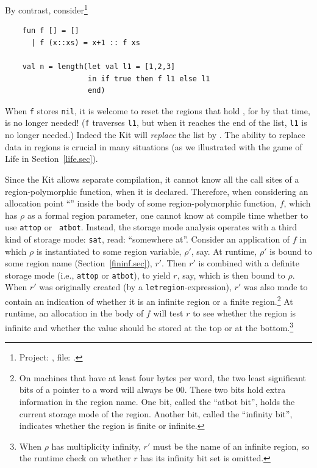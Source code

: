 \documentclass[12pt]{book}
\begin{document}
By contrast, consider\footnote{Project: , file: .}
\begin{verbatim}
    fun f [] = []
      | f (x::xs) = x+1 :: f xs

    val n = length(let val l1 = [1,2,3]
                   in if true then f l1 else l1
                   end)
\end{verbatim}
When {\tt f} stores {\tt nil}, it is welcome to reset the regions that
hold , for by that time,  is
no longer needed! ({\tt f} traverses {\tt l1}, but when it reaches the
end of the list, {\tt l1} is no longer needed.)  Indeed the Kit will
{\em replace} the list \boxml{[1,2,3]} by \boxml{[2,3,4]}. The ability
to replace data in regions is crucial in many situations (as we
illustrated with the game of Life in Section~\ref{life.sec}).

Since the Kit allows  separate compilation, it
cannot know all the call sites of a region-polymorphic function,
when it is declared.
Therefore, when considering an allocation point ``''
inside the body of some region-polymorphic function, $f$, which
has $\rho$ as a formal region parameter,
one cannot know at compile time whether to use {\tt attop} or {\tt
atbot}.  Instead, the storage mode analysis operates with a third kind of
storage mode: {\tt sat}, read: ``somewhere at''. Consider an
application of $f$ in which $\rho$ is
instantiated to some region variable, $\rho'$, say. At runtime, $\rho'$
is bound to some region name (Section~\ref{fininf.sec}), $r'$.
Then $r'$ is combined with a definite storage mode 
(i.e., {\tt attop} or {\tt atbot}), to yield $r$, say, which
is then bound to $\rho$.
When $r'$ was originally created (by a {\tt letregion}-expression),
$r'$ was also made to contain an indication
of whether it is an infinite region or a finite 
region.\footnote{On machines\label{atbit.lab} that have at least four bytes per
word, the two least significant bits of a pointer to a word
will always be 00. These two bits hold extra information in
the region name.
One bit, called the ``atbot bit'', holds the current storage mode of
the region. Another bit, called the ``infinity bit'', indicates whether
the region is finite or infinite.} 
At runtime, an allocation  in the body
of $f$ will test $r$ to see whether the region is infinite and 
whether the value should be stored at the top or at the bottom.\footnote{When
$\rho$ has multiplicity infinity, $r'$ must be the name of an infinite region,
so the runtime check on whether $r$ has its infinity bit set is omitted.}
\end{document}
